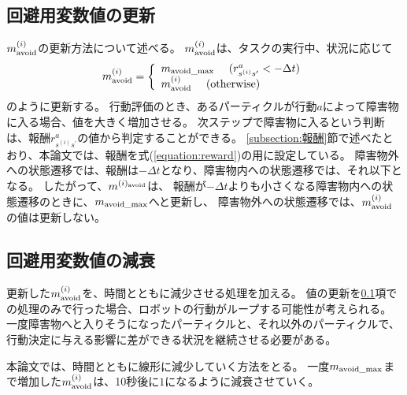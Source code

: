 \subsection{回避用変数値の更新} \label{subsection:回避用変数値の更新}
$m^{(i)}_{\rm avoid}$の更新方法について述べる。
$m^{(i)}_{\rm avoid}$は、タスクの実行中、状況に応じて
\begin{equation}
  m^{(i)}_{\rm avoid} =
  \left\{
    \begin{array}{l}
      m_{\rm avoid\_max} \ \ \ \ (r^{a}_{s^{(i)}s^{\prime}} < - \Delta t) \\
      m^{(i)}_{\rm avoid} \ \ \ \ ({\rm otherwise})
    \end{array}
  \right.
\end{equation}
のように更新する。
行動評価のとき、あるパーティクルが行動$a$によって障害物に入る場合、値を大きく増加させる。
次ステップで障害物に入るという判断は、報酬$r^{a}_{s^{(i)}s^{\prime}}$の値から判定することができる。
\ref{subsection:報酬}節で述べたとおり、本論文では、報酬を式(\ref{equation:reward})の用に設定している。
障害物外への状態遷移では、報酬は$-\Delta t$となり、障害物内への状態遷移では、それ以下となる。
したがって、$m^{(i)_{\rm avoid}}$は、
報酬が$-\Delta t$よりも小さくなる障害物内への状態遷移のときに、$m_{\rm avoid\_max}$へと更新し、
障害物外への状態遷移では、$m^{(i)}_{\rm avoid}$の値は更新しない。

\subsection{回避用変数値の減衰}
更新した$m^{(i)}_{\rm avoid}$を、時間とともに減少させる処理を加える。
値の更新を\ref{subsection:回避用変数値の更新}項での処理のみで行った場合、ロボットの行動がループする可能性が考えられる。
一度障害物へと入りそうになったパーティクルと、それ以外のパーティクルで、行動決定に与える影響に差ができる状況を継続させる必要がある。

本論文では、時間とともに線形に減少していく方法をとる。
一度$m_{\rm avoid\_max}$まで増加した$m^{(i)}_{\rm avoid}$は、10秒後に$1$になるように減衰させていく。

